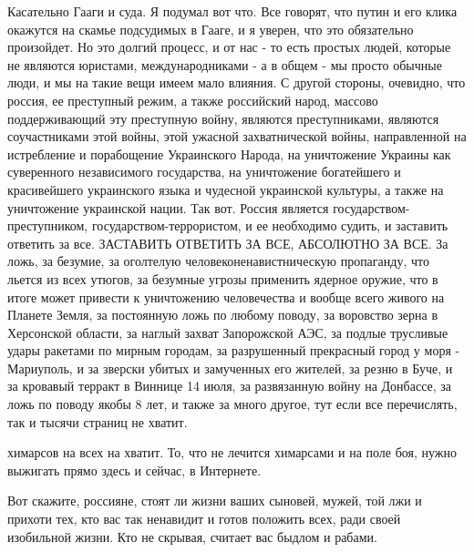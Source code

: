 Касательно Гааги и суда. Я подумал вот что. Все говорят, что путин и его клика
окажутся на скамье подсудимых в Гааге, и я уверен, что это обязательно
произойдет. Но это долгий процесс, и от нас - то есть простых людей, которые не
являются юристами, международниками - а в общем - мы просто обычные люди, и мы
на такие вещи имеем мало влияния. С другой стороны, очевидно, что россия, ее
преступный режим, а также российский народ, массово поддерживающий эту
преступную войну, являются преступниками, являются соучастниками этой войны,
этой ужасной захватнической войны, направленной на истребление и порабощение
Украинского Народа, на уничтожение Украины как суверенного независимого
государства, на уничтожение богатейшего и красивейшего украинского языка и
чудесной украинской культуры, а также на уничтожение украинской нации. Так вот.
Россия является государством-преступником, государством-террористом, и ее
необходимо судить, и заставить ответить за все. ЗАСТАВИТЬ ОТВЕТИТЬ ЗА ВСЕ,
АБСОЛЮТНО ЗА ВСЕ. За ложь, за безумие, за оголтелую человеконенавистническую
пропаганду, что льется из всех утюгов, за безумные угрозы применить ядерное
оружие, что в итоге может привести к уничтожению человечества и вообще всего
живого на Планете Земля, за постоянную ложь по любому поводу, за воровство
зерна в Херсонской области, за наглый захват Запорожской АЭС, за подлые
трусливые удары ракетами по мирным городам, за разрушенный прекрасный город у
моря - Мариуполь, и за зверски убитых и замученных его жителей, за резню в
Буче, и за кровавый терракт в Виннице 14 июля, за развязанную войну на
Донбассе, за ложь по поводу якобы 8 лет, и также за много другое, тут если все
перечислять, так и тысячи страниц не хватит.

химарсов на всех на хватит. То, что не лечится химарсами и на поле боя, нужно
выжигать прямо здесь и сейчас, в Интернете.

Вот скажите, россияне, стоят ли жизни ваших сыновей, мужей, той лжи и прихоти
тех, кто вас так ненавидит и готов положить всех, ради своей изобильной жизни.
Кто не скрывая, считает вас быдлом и рабами.

